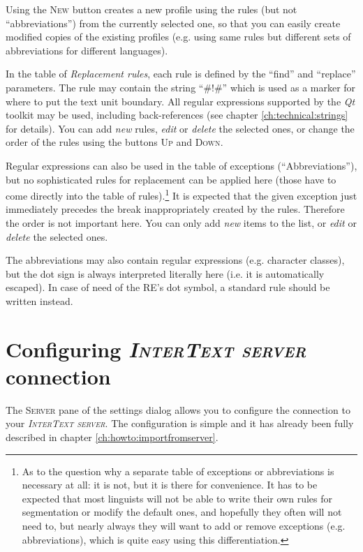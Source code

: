 \documentclass[a4paper,10pt,oneside]{book}
\newcommand{\ITserver}{\textit{\textsc{InterText server}}\xspace}
\newcommand{\menu}[1]{\textsc{#1}}
\begin{document}
Using the \menu{New} button creates a new profile using the rules (but not ``abbreviations'') from the currently selected one, so that you can easily create modified copies of the existing profiles (e.g. using same rules but different sets of abbreviations for different languages).

In the table of \emph{Replacement rules}, each rule is defined by the ``find'' and ``replace'' parameters. The rule may contain the string ``\#!\#'' which is used as a marker for where to put the text unit boundary. All regular expressions supported by the \emph{Qt} toolkit may be used, including back-references (see chapter \ref{ch:technical:strings} for details). You can add \emph{new} rules, \emph{edit} or \emph{delete} the selected ones, or change the order of the rules using the buttons \menu{Up} and \menu{Down}.

Regular expressions can also be used in the table of exceptions (``Abbreviations''), but no sophisticated rules for replacement can be applied here (those have to come directly into the table of rules).\footnote{As to the question why a separate table of exceptions or abbreviations is necessary at all: it is not, but it is there for convenience. It has to be expected that most linguists will not be able to write their own rules for segmentation or modify the default ones, and hopefully they often will not need to, but nearly always they will want to add or remove exceptions (e.g. abbreviations), which is quite easy using this differentiation.} It is expected that the given exception just immediately precedes the break inappropriately created by the rules. Therefore the order is not important here. You can only add \emph{new} items to the list, or \emph{edit} or \emph{delete} the selected ones.

The abbreviations may also contain regular expressions (e.g. character classes), but the dot sign is always interpreted literally here (i.e. it is automatically escaped). In case of need of the RE's dot symbol, a standard rule should be written instead.

\section{Configuring \ITserver connection}\label{ch:detail:config:server}

The \menu{Server} pane of the settings dialog allows you to configure the connection to your \ITserver. The configuration is simple and it has already been fully described in chapter \ref{ch:howto:importfromserver}.
\end{document}
